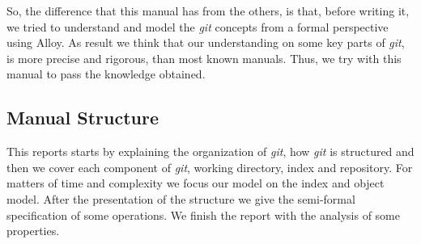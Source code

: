 So, the difference that this manual has from the others, is
that, before writing it, we tried to understand and model 
the \emph{git} concepts from a formal perspective using Alloy. As result 
we think that our understanding on some key parts of \emph{git}, is more precise
and rigorous, than most known manuals. Thus, we try with this manual
to pass the knowledge obtained. \par 

\subsection{Manual Structure}
This reports starts by explaining the organization of \emph{git}, how
\emph{git} is
structured and then we cover each component of \emph{git}, working directory,
index and repository. For matters
of time and complexity we focus our model on the index and object
model. After the presentation of the structure we give the semi-formal
specification of some operations. We finish the report with the
analysis of some properties.


